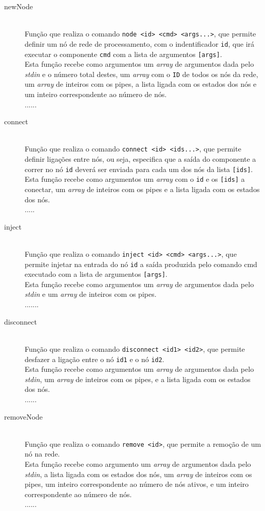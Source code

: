 \documentclass[12pt]{article}
\begin{document}
\begin{description} 
\item[newNode] \hfill \\
Função que realiza o comando \texttt{node <id> <cmd> <args...>}, que permite definir um nó de rede de processamento, com o indentificador  \texttt{id}, que irá executar o componente \texttt{cmd} com a lista de argumentos \texttt{[args]}. 
\\Esta função recebe como argumentos um \textit{array} de argumentos dada pelo \textit{stdin} e o número total destes, um \textit{array} com o \texttt{ID} de todos os nós da rede, um \textit{array} de inteiros com os pipes, a lista ligada com os estados dos nós e um inteiro correspondente ao número de nós.
\\......

\item[connect] \hfill \\
Função que realiza o comando \texttt{connect <id> <ids...>}, que permite definir ligações entre nós, ou seja, especifica que a saída do componente a correr no nó \texttt{id} deverá ser enviada para cada um dos nós da lista \texttt{[ids]}. 
\\Esta função recebe como argumentos um \textit{array} com o \texttt{id} e os \texttt{[ids]} a conectar, um \textit{array} de inteiros com os pipes e a lista ligada com os estados dos nós.
\\..... 

\item[inject] \hfill \\
Função que realiza o comando \texttt{inject <id> <cmd> <args...>}, que permite injetar na entrada do nó \texttt{id} a saída produzida pelo comando cmd executado com a lista de argumentos \texttt{[args]}. 
\\Esta função recebe como argumentos um \textit{array} de argumentos dada pelo \textit{stdin} e  um \textit{array} de inteiros com os pipes.
\\.......

\item[disconnect] \hfill \\
Função que realiza o comando \texttt{disconnect <id1> <id2>}, que permite desfazer a ligação entre o nó \texttt{id1} e o nó \texttt{id2}. 
\\Esta função recebe como argumentos um \textit{array} de argumentos dada pelo \textit{stdin}, um \textit{array} de inteiros com os pipes, e a lista ligada com os estados dos nós.
\\......

\item[removeNode] \hfill \\
Função que realiza o comando \texttt{remove <id>}, que permite a remoção de um nó na rede. 
\\Esta função recebe como argumento um \textit{array} de argumentos dada pelo \textit{stdin}, a lista ligada com os estados dos nós, um \textit{array} de inteiros com os pipes, um inteiro correspondente ao número de nós ativos, e um inteiro correspondente ao número de nós.
\\...... 
\end{description}
\end{document}
